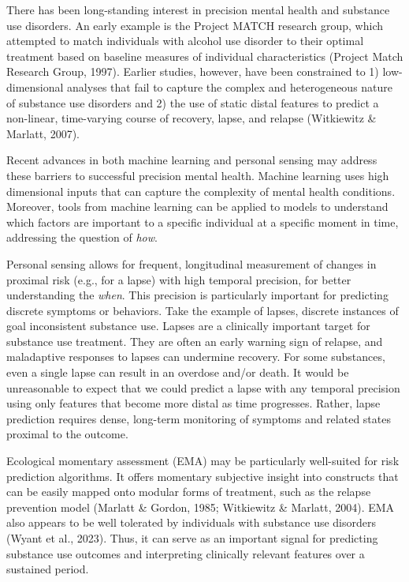 \documentclass[
]{agujournal2019}
\begin{document}
There has been long-standing interest in precision mental health and
substance use disorders. An early example is the Project MATCH research
group, which attempted to match individuals with alcohol use disorder to
their optimal treatment based on baseline measures of individual
characteristics (Project Match Research Group, 1997). Earlier studies,
however, have been constrained to 1) low-dimensional analyses that fail
to capture the complex and heterogeneous nature of substance use
disorders and 2) the use of static distal features to predict a
non-linear, time-varying course of recovery, lapse, and relapse
(Witkiewitz \& Marlatt, 2007).

Recent advances in both machine learning and personal sensing may
address these barriers to successful precision mental health. Machine
learning uses high dimensional inputs that can capture the complexity of
mental health conditions. Moreover, tools from machine learning can be
applied to models to understand which factors are important to a
specific individual at a specific moment in time, addressing the
question of \emph{how}.

Personal sensing allows for frequent, longitudinal measurement of
changes in proximal risk (e.g., for a lapse) with high temporal
precision, for better understanding the \emph{when}. This precision is
particularly important for predicting discrete symptoms or behaviors.
Take the example of lapses, discrete instances of goal inconsistent
substance use. Lapses are a clinically important target for substance
use treatment. They are often an early warning sign of relapse, and
maladaptive responses to lapses can undermine recovery. For some
substances, even a single lapse can result in an overdose and/or death.
It would be unreasonable to expect that we could predict a lapse with
any temporal precision using only features that become more distal as
time progresses. Rather, lapse prediction requires dense, long-term
monitoring of symptoms and related states proximal to the outcome.

Ecological momentary assessment (EMA) may be particularly well-suited
for risk prediction algorithms. It offers momentary subjective insight
into constructs that can be easily mapped onto modular forms of
treatment, such as the relapse prevention model (Marlatt \& Gordon,
1985; Witkiewitz \& Marlatt, 2004). EMA also appears to be well
tolerated by individuals with substance use disorders (Wyant et al.,
2023). Thus, it can serve as an important signal for predicting
substance use outcomes and interpreting clinically relevant features
over a sustained period.
\end{document}

